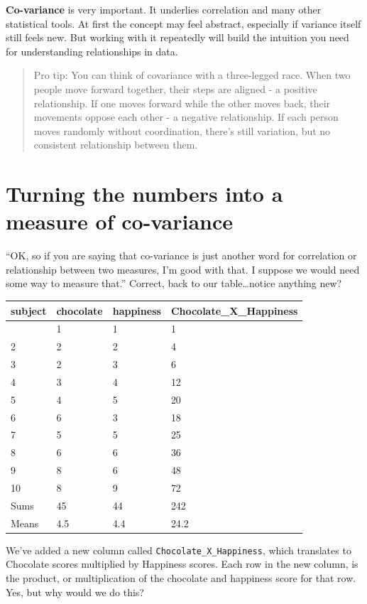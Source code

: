 \documentclass[
  letterpaper,
  DIV=11,
  numbers=noendperiod]{scrreprt}
\begin{document}
\textbf{Co-variance} is very important. It underlies correlation and
many other statistical tools. At first the concept may feel abstract,
especially if variance itself still feels new. But working with it
repeatedly will build the intuition you need for understanding
relationships in data.

\begin{quote}
Pro tip: You can think of covariance with a three-legged race. When two
people move forward together, their steps are aligned - a positive
relationship. If one moves forward while the other moves back, their
movements oppose each other - a negative relationship. If each person
moves randomly without coordination, there's still variation, but no
consistent relationship between them.
\end{quote}

\section{Turning the numbers into a measure of
co-variance}\label{turning-the-numbers-into-a-measure-of-co-variance}

``OK, so if you are saying that co-variance is just another word for
correlation or relationship between two measures, I'm good with that. I
suppose we would need some way to measure that.'' Correct, back to our
table\ldots notice anything new?

\begin{longtable}[]{@{}llll@{}}
\toprule\noalign{}
subject & chocolate & happiness & Chocolate\_X\_Happiness \\
\midrule\noalign{}
\endhead
\bottomrule\noalign{}
\endlastfoot
1 & 1 & 1 & 1 \\
2 & 2 & 2 & 4 \\
3 & 2 & 3 & 6 \\
4 & 3 & 4 & 12 \\
5 & 4 & 5 & 20 \\
6 & 6 & 3 & 18 \\
7 & 5 & 5 & 25 \\
8 & 6 & 6 & 36 \\
9 & 8 & 6 & 48 \\
10 & 8 & 9 & 72 \\
Sums & 45 & 44 & 242 \\
Means & 4.5 & 4.4 & 24.2 \\
\end{longtable}

We've added a new column called \texttt{Chocolate\_X\_Happiness}, which
translates to Chocolate scores multiplied by Happiness scores. Each row
in the new column, is the product, or multiplication of the chocolate
and happiness score for that row. Yes, but why would we do this?
\end{document}
